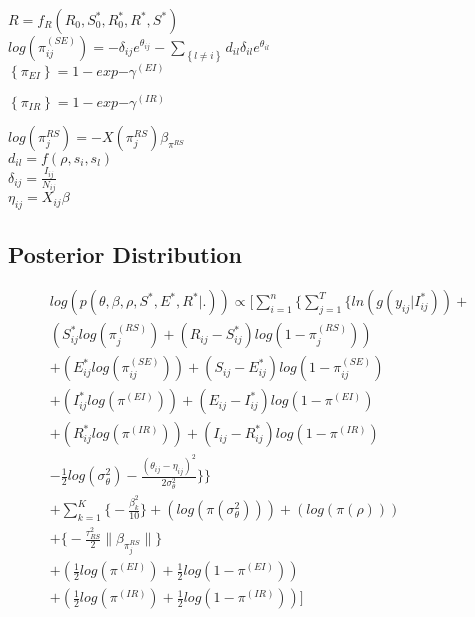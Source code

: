 \documentclass[12pt]{article}
\newcommand \noi {\noindent}
\newcommand \mbreak {\\ \vspace{0.1in}}
\begin{document}
\noi $R = f_R(R_0, S^*_0, R^*_0, R^*, S^*)$ \\

\noi $\displaystyle log(\pi^{(SE)}_{ij}) = -\delta_{ij}e^{\theta_{ij}} - \sum_{\left\{ l \ne i \right\}}d_{il}\delta_{il}e^{\theta_{il}}$\\

\noi $\left\{\pi_{EI}  \right\} = 1-exp{-\gamma^{(EI)}}$

\noi $\left\{\pi_{IR}  \right\} = 1-exp{-\gamma^{(IR)}}$

\noi $log(\pi_j^{RS}) = -X(\pi_j^{RS}) \beta_{\pi^{RS}}$\\

\noi $d_{il} = f(\rho, s_i, s_l)$\\

\noi $\delta_{ij} = \frac{I_{ij}}{N_{ij}}$ \\

\noi $\eta_{ij} = X_{ij}\beta$\mbreak

\subsection{Posterior Distribution}

\begin{center}
\begin{multline}
\displaystyle
log(p(\theta,\beta,\rho,S^*,E^*,R^*|.)) \propto \Bigg[ 
    \sum_{i=1}^n \bigg\{ \sum_{j=1}^T
        \Big\{ ln(g(y_{ij}|I^*_{ij})) + \\ 
            (S^*_{ij}log(\pi_j^{(RS)}) + (R_{ij} - S^*_{ij})log(1-\pi_j^{(RS)})) \\
            + (E^*_{ij}log(\pi_{ij}^{(SE)})) + (S_{ij} - E^*_{ij})log(1-\pi_{ij}^{(SE)}) \\
            + (I^*_{ij}log(\pi^{(EI)})) + (E_{ij} - I^*_{ij})log(1-\pi^{(EI)}) \\
            + (R^*_{ij}log(\pi^{(IR)})) + (I_{ij} - R^*_{ij})log(1-\pi^{(IR)}) \\
    - \frac{1}{2}log(\sigma^2_{\theta}) - \frac{(\theta_{ij}-\eta_{ij})^2}{2\sigma^2_{\theta}}\Big\}\bigg\} \\
    + \sum_{k = 1}^K\bigg\{-\frac{\beta^2_k}{10}\bigg\}
            + (log(\pi(\sigma^2_{\theta})))
            + (log(\pi(\rho)))\\
            + \bigg\{ -\frac{\tau^2_{RS}}{2}\|\beta_{\pi_j^{RS}}\|  \bigg\} \\ 
            + (\frac{1}{2}log(\pi^{(EI)}) + \frac{1}{2}log(1-\pi^{(EI)})) \\
            + (\frac{1}{2}log(\pi^{(IR)}) + \frac{1}{2}log(1-\pi^{(IR)})) \Bigg]\\
\end{multline}
\end{center}
\end{document}
